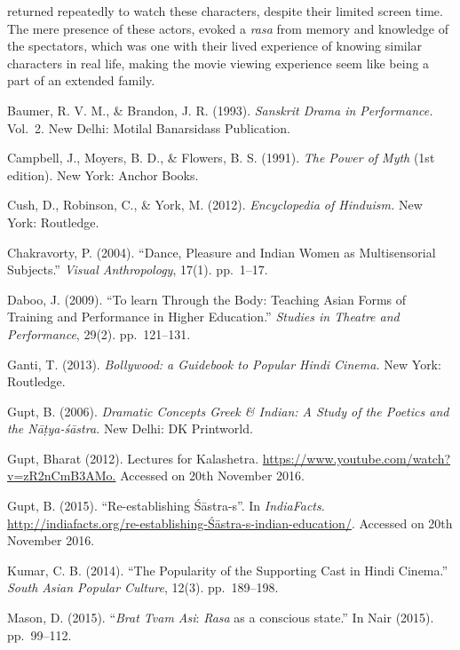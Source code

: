 returned repeatedly to watch these characters, despite their limited screen time. The mere presence of these actors, evoked a \textsl{rasa} from memory and knowledge of the spectators, which was one with their lived experience of knowing similar characters in real life, making the movie viewing experience seem like being a part of an extended family.

\begin{thebibliography}{99}
\itemsep=2pt
Baumer, R. V. M., \& Brandon, J. R. (1993). \textsl{Sanskrit Drama in Performance.} Vol.~2. New Delhi: Motilal Banarsidass Publication. 

Campbell, J., Moyers, B. D., \& Flowers, B. S. (1991). \textsl{The Power of Myth} (1st edition). New York: Anchor Books.

Cush, D., Robinson, C., \& York, M. (2012). \textsl{Encyclopedia of Hinduism.} New York: Routledge.

Chakravorty, P. (2004). “Dance, Pleasure and Indian Women as Multisensorial Subjects.” \textsl{Visual Anthropology}, 17(1). pp.~1--17. 

Daboo, J. (2009). “To learn Through the Body: Teaching Asian Forms of Training and Performance in Higher Education.” \textsl{Studies in Theatre and Performance}, 29(2). pp.~121--131.

Ganti, T. (2013). \textsl{Bollywood: a Guidebook to Popular Hindi Cinema.} New York: Routledge. 

Gupt, B. (2006). \textsl{Dramatic Concepts Greek \& Indian: A Study of the Poetics and the Nāṭya-śāstra.} New Delhi: DK Printworld.

Gupt, Bharat (2012). Lectures for Kalashetra. \url{https://www.youtube.com/watch?v=zR2nCmB3AMo.} Accessed on 20th November 2016.

Gupt, B. (2015). “Re-establishing Śāstra-s”. In \textsl{IndiaFacts}. \url{http://indiafacts.org/re-establishing-Śāstra-s-indian-education/}. Accessed on 20th November 2016.

Kumar, C. B. (2014). “The Popularity of the Supporting Cast in Hindi Cinema.” \textsl{South Asian Popular Culture}, 12(3). pp.~189--198.

Mason, D. (2015). “\textsl{Brat Tvam Asi}: \textsl{Rasa} as a conscious state.” In Nair (2015). pp.~99--112.


\end{thebibliography}
